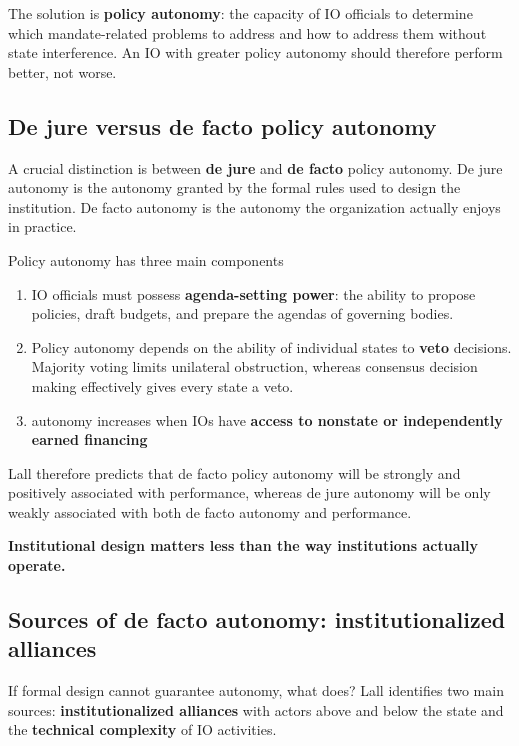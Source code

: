 The solution is \textbf{policy autonomy}: the capacity of IO officials to determine which mandate-related problems to address and how to address them without state interference. An IO with greater policy autonomy should therefore perform better, not worse.

\subsection{De jure versus de facto policy autonomy}

A crucial distinction is between \textbf{de jure} and \textbf{de facto} policy autonomy. De jure autonomy is the autonomy granted by the formal rules used to design the institution. De facto autonomy is the autonomy the organization actually enjoys in practice.

Policy autonomy has three main components

\begin{enumerate}
    \item IO officials must possess \textbf{agenda-setting power}: the ability to propose policies, draft budgets, and prepare the agendas of governing bodies.
    
    \item Policy autonomy depends on the ability of individual states to \textbf{veto} decisions. Majority voting limits unilateral obstruction, whereas consensus decision making effectively gives every state a veto. 
    
    \item autonomy increases when IOs have \textbf{access to nonstate or independently earned financing}
\end{enumerate}

Lall therefore predicts that de facto policy autonomy will be strongly and positively associated with performance, whereas de jure autonomy will be only weakly associated with both de facto autonomy and performance.

\textbf{Institutional design matters less than the way institutions actually operate.}

\subsection{Sources of de facto autonomy: institutionalized alliances}

If formal design cannot guarantee autonomy, what does? Lall identifies two main sources: \textbf{institutionalized alliances} with actors above and below the state and the \textbf{technical complexity} of IO activities.

